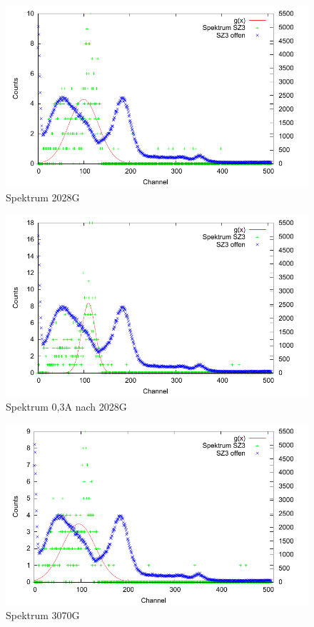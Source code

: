 \begin{figure}
 \includegraphics[width=\textwidth]{Graphen/quench/spektrum_2028.pdf}
 \caption{Spektrum 2028G}
\end{figure}


\begin{figure}
 \includegraphics[width=\textwidth]{Graphen/quench/spektrum_0-3_nach_2028.pdf}
 \caption{Spektrum 0,3A nach 2028G}
\end{figure}


\begin{figure}
 \includegraphics[width=\textwidth]{Graphen/quench/spektrum_3070.pdf}
 \caption{Spektrum 3070G}
\end{figure}

